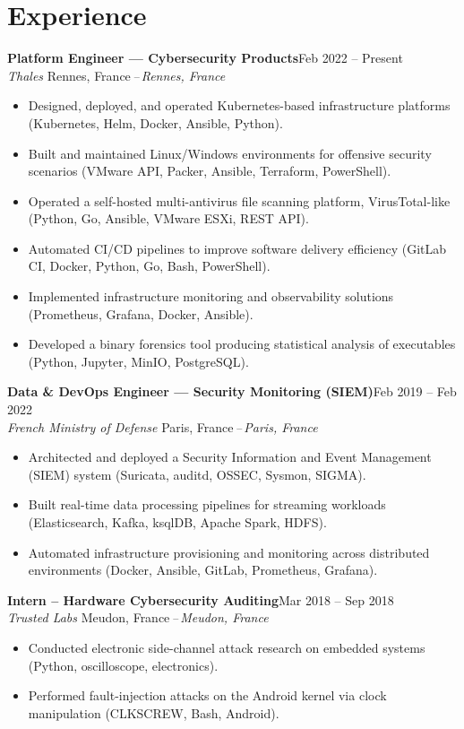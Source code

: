 \documentclass[10pt,a4paper]{article}
\newcommand{\cventry}[4]{%
  \textbf{#1}\hfill\textcolor{muted}{\small #4}\\[0.5pt]%
  \textcolor{accent}{\itshape #2}%
  \ifx\relax#3\relax\else\textcolor{muted}{\itshape\,--\,#3}\fi\par\vspace{1.5pt}%
}
\begin{document}
\vspace{-7pt}
\section{Experience}

\cventry{Platform Engineer --- Cybersecurity Products}{Thales}{Rennes, France}{Feb 2022 -- Present}
\begin{itemize}
  \item Designed, deployed, and operated Kubernetes-based infrastructure platforms (Kubernetes, Helm, Docker, Ansible, Python).
  \item Built and maintained Linux/Windows environments for offensive security scenarios (VMware API, Packer, Ansible, Terraform, PowerShell).
  \item Operated a self-hosted multi-antivirus file scanning platform, VirusTotal-like (Python, Go, Ansible, VMware ESXi, REST API).
  \item Automated CI/CD pipelines to improve software delivery efficiency (GitLab CI, Docker, Python, Go, Bash, PowerShell).
  \item Implemented infrastructure monitoring and observability solutions (Prometheus, Grafana, Docker, Ansible).
  \item Developed a binary forensics tool producing statistical analysis of executables (Python, Jupyter, MinIO, PostgreSQL).
\end{itemize}

\cventry{Data \& DevOps Engineer --- Security Monitoring (SIEM)}{French Ministry of Defense}{Paris, France}{Feb 2019 -- Feb 2022}
\begin{itemize}
  \item Architected and deployed a Security Information and Event Management (SIEM) system (Suricata, auditd, OSSEC, Sysmon, SIGMA).
  \item Built real-time data processing pipelines for streaming workloads (Elasticsearch, Kafka, ksqlDB, Apache Spark, HDFS).
  \item Automated infrastructure provisioning and monitoring across distributed environments (Docker, Ansible, GitLab, Prometheus, Grafana).
\end{itemize}

\cventry{Intern -- Hardware Cybersecurity Auditing}{Trusted Labs}{Meudon, France}{Mar 2018 -- Sep 2018}
\begin{itemize}
  \item Conducted electronic side-channel attack research on embedded systems (Python, oscilloscope, electronics).
  \item Performed fault-injection attacks on the Android kernel via clock manipulation (CLKSCREW, Bash, Android).
\end{itemize}
\end{document}
